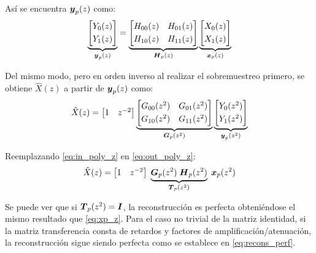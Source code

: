 		Así se encuentra $\boldsymbol{y}_p(z)$ como:
		\begin{equation}
		\underbrace{\begin{bmatrix} Y_0(z)\\[0.3em] Y_1(z) \end{bmatrix}}_{\boldsymbol{y}_p(z)} = \underbrace{\begin{bmatrix} H_{00}(z) & H_{01}(z) \\[0.3em] H_{10}(z) & H_{11}(z) \end{bmatrix}}_{\boldsymbol{H}_p(z)} \underbrace{\begin{bmatrix} X_0(z) \\[0.3em] X_1(z) \end{bmatrix}}_{\boldsymbol{x}_p(z)}
			\label{eq:in_poly_z}
		\end{equation}

		Del mismo modo, pero en orden inverso al realizar el sobremuestreo primero, se obtiene $\hat{X}(z)$ a partir de $\boldsymbol{y}_p(z)$ como:
		\begin{equation}
		\hat{X}(z) = \begin{bmatrix} 1 & z^{-2} \end{bmatrix} \underbrace{\begin{bmatrix} G_{00}(z^2) & G_{01}(z^2) \\[0.3em] G_{10}(z^2) & G_{11}(z^2) \end{bmatrix}}_{\boldsymbol{G}_p(z^2)} \underbrace{\begin{bmatrix} Y_0(z^2)\\[0.3em] Y_1(z^2) \end{bmatrix}}_{\boldsymbol{y}_p(z^2)} 
			\label{eq:out_poly_z}
		\end{equation}

		Reemplazando \eqref{eq:in_poly_z} en \eqref{eq:out_poly_z}:
		\begin{equation*}
		\hat{X}(z) = \begin{bmatrix} 1 & z^{-2} \end{bmatrix}\; \underbrace{\boldsymbol{G}_p(z^2) \; \boldsymbol{H}_p(z^2)}_{\boldsymbol{T}_p(z^2)} \; \boldsymbol{x}_p(z^2)
		\end{equation*}

		Se puede ver que si $\boldsymbol{T}_p(z^2) = \boldsymbol{I}$, la reconstrucción es perfecta obteniéndose el mismo resultado que \eqref{eq:xp_z}. Para el caso no trivial de la matriz identidad, si la matriz transferencia consta de retardos y factores de amplificación/atenuación, la reconstrucción sigue siendo perfecta como se establece en \eqref{eq:recons_perf}.

